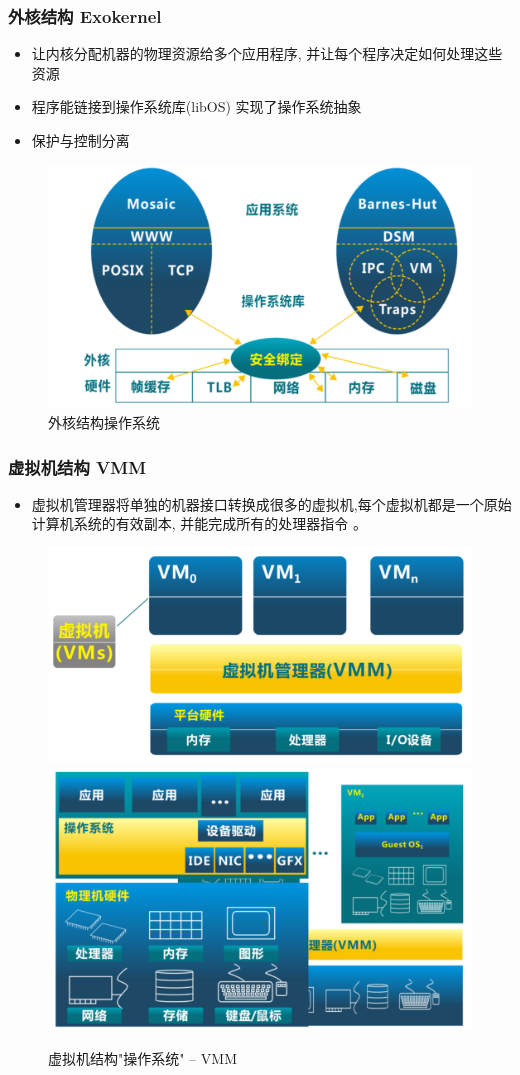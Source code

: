 \documentclass[UTF8]{ctexbeamer}
\begin{document}
\begin{frame}
	
	\frametitle{外核结构 Exokernel}
	
	\begin{itemize}
		\item 让内核分配机器的物理资源给多个应用程序, 并让每个程序决定如何处理这些资源
		\item 程序能链接到操作系统库(libOS) 实现了操作系统抽象
		\item 保护与控制分离
	\end{itemize}
	\begin{figure}
		\centering
		\includegraphics[width=0.6\linewidth]{exokernel-arch}
		\caption{外核结构操作系统}
	\end{figure}
	
\end{frame}

\begin{frame}
	
	\frametitle{虚拟机结构 VMM}
	
	\begin{itemize}
		\item 虚拟机管理器将单独的机器接口转换成很多的虚拟机,每个虚拟机都是一个原始计算机系统的有效副本, 并能完成所有的处理器指令 。
	\end{itemize}
	\begin{figure}
		\centering
		\includegraphics[width=0.45\linewidth]{vmm-arch}
		\includegraphics[width=0.45\linewidth]{vmm-arch-view}
		\caption{虚拟机结构"操作系统" -- VMM}
	\end{figure}
	
\end{frame}
\end{document}
